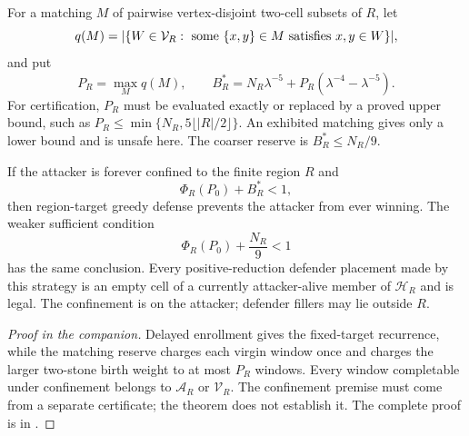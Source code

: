 \begin{definition}
\label{def:ES-D7}
For a matching $M$ of pairwise vertex-disjoint two-cell subsets of $R$, let
\[
  q(M)=|\{W\in\mathcal V_R:\textup{ some }\{x,y\}\in M
                                      \textup{ satisfies }x,y\in W\}|,
\]
and put
\[
  P_R=\max_M q(M),
  \qquad
  B_R^*=N_R\lambda^{-5}+P_R(\lambda^{-4}-\lambda^{-5}).
\]
For certification, $P_R$ must be evaluated exactly or replaced by a proved
upper bound, such as
$P_R\le\min\{N_R,5\lfloor|R|/2\rfloor\}$.  An exhibited matching gives only a
lower bound and is unsafe here.  The coarser reserve is $B_R^*\le N_R/9$.
\end{definition}

\begin{theorem}
\label{thm:ES-T4}
If the attacker is forever confined to the finite region $R$ and
\[
  \Phi_R(P_0)+B_R^*<1,
\]
then region-target greedy defense prevents the attacker from ever winning.
The weaker sufficient condition
\[
  \Phi_R(P_0)+\frac{N_R}{9}<1
\]
has the same conclusion.  Every positive-reduction defender placement made by
this strategy is an empty cell of a currently attacker-alive member of
$\mathcal H_R$ and is legal.  The confinement is on the attacker; defender
fillers may lie outside $R$.
\end{theorem}

\begin{proof}[Proof in the companion]
Delayed enrollment gives the fixed-target recurrence, while the matching
reserve charges each virgin window once and charges the larger two-stone birth
weight to at most $P_R$ windows.  Every window completable under confinement
belongs to $\mathcal A_R$ or $\mathcal V_R$.  The confinement premise must
come from a separate certificate; the theorem does not establish it.  The
complete proof is in \cite{hexobot-companions}.
\end{proof}


